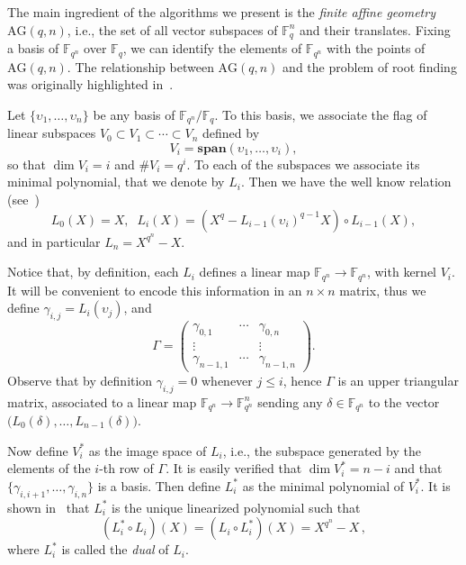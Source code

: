 \documentclass{sig-alternate}
\newcommand{\ff}[1]{\mathbb{F}_{#1}}
\newcommand{\qq}{q}
\newcommand{\nn}{n}
\newcommand{\qn}{{\qq^\nn}}
\newcommand{\basef}{\ff{\qq}}
\newcommand{\extf}{\ff{\qn}}
\newcommand{\AG}{\mathrm{AG}(\qq,\nn)}
\newcommand{\Span}{\mathbf{span}}
\newcommand{\card}[1]{\# #1}
\newcounter{algo}
\renewcommand{\paragraph}[1]{\smallskip\noindent{{\bf \rm #1.}}}
\begin{document}

The main ingredient of the algorithms we present is the \emph{finite
  affine geometry} $\AG$, i.e., the set of all vector subspaces of
$\basef^\nn$ and their translates. Fixing a basis
of $\extf$ over $\basef$, we can
identify the elements of $\extf$ with the points of $\AG$. The
relationship between $\AG$ and the problem of root finding was
originally highlighted in~\cite{OorschotV90}.

\paragraph{Approximating $\extf$ by a flag} Let
$\{\upsilon_1,\ldots,\upsilon_\nn\}$ be any basis of
$\extf/\basef$. To this basis, we associate the flag of linear
subspaces $V_0\subset V_1\subset \cdots \subset V_\nn$ defined by
\begin{equation}
  V_i = \Span(\upsilon_1,\dots,\upsilon_i),
\end{equation}
so that $\dim V_i = i$ and $\card V_i = \qq^i$. To each of the
subspaces we associate its minimal polynomial, that we denote by
$L_i$. Then we have the well know relation (see~\cite[Ch. 11]{mBER84a})
\begin{equation}
\label{Li_generation}
  L_0(X) = X, \; \;  L_i(X) = (X^\qq - L_{i-1}(\upsilon_i)^{\qq-1}X)\circ L_{i-1}(X),
\end{equation}
and in particular $L_\nn=X^\qn-X$.

Notice that, by definition, each $L_i$ defines a linear map
$\extf\to\extf$, with kernel $V_i$. It will be convenient to encode
this information in an $\nn\times\nn$ matrix, thus we define
$\gamma_{i,j}=L_i(\upsilon_j)$, and
\begin{equation}
  \label{eq:Gamma}
  \Gamma =
  \begin{pmatrix}
    \gamma_{0,1} & \cdots & \gamma_{0,\nn}\\
    \vdots & & \vdots\\
    \gamma_{\nn-1,1} & \cdots & \gamma_{\nn-1,\nn}
  \end{pmatrix}.
\end{equation}
Observe that by definition $\gamma_{i,j}=0$ whenever $j\le i$, hence
$\Gamma$ is an upper triangular matrix, associated to a linear map
$\extf\to\extf^\nn$ sending any $\delta\in\extf$ to the vector
$\bigl(L_0(\delta),\dots,\allowbreak L_{n-1}(\delta)\bigr)$.  

Now define $V_i^\ast$ as the image space of $L_i$, i.e., the subspace
generated by the elements of the $i$-th row of $\Gamma$.  It is easily verified that
$\dim V_i^\ast=n-i$ and that $\{\gamma_{i,i+1},\dots,\gamma_{i,\nn}\}$
is a basis. Then define $L_i^\ast$ as the minimal polynomial of
$V_i^\ast$. It is shown in~\cite[Ch. 11]{mBER84a} that
$L_i^\ast$ is the unique linearized polynomial such that
\begin{equation}
\label{dual_polynomial}
(L_i^\ast \circ L_i)(X)=(L_i \circ L_i^\ast)(X)=X^\qn-X\,,
\end{equation}
where $L_i^\ast$ is called the \emph{dual} of $L_i$.
\end{document}
